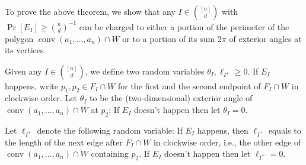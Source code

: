 \documentclass{article}\usepackage[a4paper,margin=20mm]{geometry}
\newcommand{\conv}{\operatorname{conv}}
\begin{document}
To prove the above theorem, we show that any $I \in \binom{[n]}{d}$
with $\Pr[E_I] \geq \binom{n}{d}^{-1}$ can be charged to either
a portion of the perimeter of the polygon $\conv(a_1,\dots,a_n)\cap W$
or to a portion of its sum $2\pi$ of exterior angles at its vertices.
\begin{definition}
    Given any $I \in \binom{[n]}{d}$, we define two random variables $\theta_I, \ell_{I^+} \geq 0$.
    If $E_I$ happens, write $p_1, p_2 \in F_I \cap W$ for the first and the second endpoint of $F_I \cap W$ in clockwise order.
    Let $\theta_I$ to be the (two-dimensional) exterior angle of $\conv(a_1, \ldots, a_n) \cap W$ at $p_2$; 
    If $E_I$ doesn't happen then let $\theta_I = 0$.
    
    Let $\ell_{I^+}$ denote the following random variable: 
    If $E_I$ happens, then $\ell_{I^+}$ equals to the length of the next edge
    after $F_I \cap W$ in clockwise order, i.e., the other edge
    of $\conv(a_1, \ldots, a_n) \cap W$ containing $p_2$.
    If $E_I$ doesn't happen then let $\ell_{I^+} = 0$.
\end{definition}
    
    

    
\end{document}

